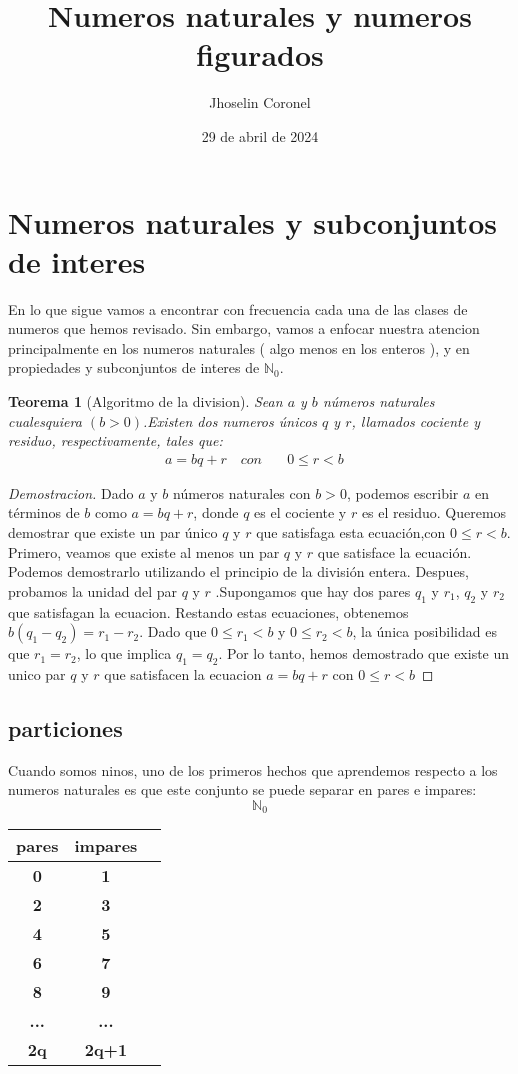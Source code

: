 \documentclass{article}
\title{Numeros naturales y numeros figurados }
\author{Jhoselin Coronel}
\date{29 de abril de 2024}
\newtheorem{teor}{Teorema}
\begin{document}
\maketitle
\section{Numeros naturales y subconjuntos de interes}
En lo que sigue vamos a encontrar con frecuencia cada una de las clases de numeros que hemos revisado. Sin embargo, vamos a enfocar nuestra atencion principalmente en los numeros naturales ( algo menos en los enteros ), y en propiedades y subconjuntos de interes de $\mathbb{N}_0$.\cite{vazquez2017numeros}
\begin{teor}[Algoritmo de la division]\label{uno}
Sean $a$ y $b$ números naturales cualesquiera $\left ( b> 0 \right )$.Existen dos numeros únicos $q$ y $r$, llamados cociente y residuo, respectivamente, tales que:
\begin{align*}
a= bq+r \quad con & \quad 0\leq r< b& 
\end{align*}
\end{teor}

\begin{proof}[Demostracion]
Dado $a$ y $b$ números naturales con $b>0$, podemos escribir 
$a$ en términos de $b$ como $a=bq+r$, donde 
$q$ es el cociente y 
$r$ es el residuo. Queremos demostrar que existe un par único $q$ y $r$ que satisfaga esta ecuación,con $0\leq r< b$. Primero, veamos que existe al menos un par $q$ y $r$ que satisface la ecuación. Podemos demostrarlo utilizando el principio de la división entera.
Despues, probamos la unidad del par $q$ y $r$ .Supongamos que hay dos pares $q_1$ y $r_1$, $q_2$ y $r_2$ que satisfagan la ecuacion. Restando estas ecuaciones, obtenemos $b(q_1-q_2)=r_1-r_2$. Dado que $0\leq r_1< b$ y $0\leq r_2< b$, la única posibilidad es que $r_1= r_2$, lo que implica  $q_1= q_2$. Por lo tanto, hemos demostrado que existe un unico par $q$ y $r$ que satisfacen la ecuacion $a=bq+r$ con $0\leq r< b$
\end{proof}
\subsection{particiones}
Cuando somos ninos, uno de los primeros hechos que aprendemos respecto a los numeros naturales es que este conjunto se puede separar en pares e impares:
$$\mathbb{N}_0$$
\begin{center}
\begin{tabular}{|c|c|c|}
\hline
\color{red} \bf pares & \color{red} \bf impares \\
\hline  
\bf 0& \bf 1 \\
\hline
\bf 2 & \bf 3\\
\hline
\bf 4 & \bf 5\\
\hline
\bf 6 & \bf 7\\
\hline
\bf 8 & \bf 9\\
\hline
\bf ... & \bf ...\\
\hline
\bf 2q & \bf 2q+1\\
\hline
\end{tabular}
\end{center}
\end{document}
